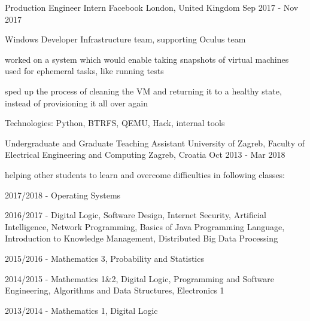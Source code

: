 \begin{cventries}
  \cventry
    {Production Engineer Intern} %
    {Facebook} %
    {London, United Kingdom} %
    {Sep 2017 - Nov 2017} %
    {
      \begin{cvitems} %
        \item {Windows Developer Infrastructure team, supporting Oculus team}
        \item {worked on a system which would enable taking snapshots of virtual machines used for ephemeral tasks, like running tests}
        \item {sped up the process of cleaning the VM and returning it to a healthy state, instead of provisioning it all over again}
        \item {Technologies: Python, BTRFS, QEMU, Hack, internal tools}
      \end{cvitems}
    }

  \cventry
    {Undergraduate and Graduate Teaching Assistant} %
    {University of Zagreb, Faculty of Electrical Engineering and Computing} %
    {Zagreb, Croatia} %
    {Oct 2013 - Mar 2018} %
    {
      \begin{cvitems} %
        \item {helping other students to learn and overcome difficulties in following classes:}
        \item {2017/2018 - Operating Systems}
        \item {2016/2017 - Digital Logic, Software Design, Internet Security, Artificial Intelligence, Network Programming, Basics of Java Programming Language, Introduction to Knowledge Management, Distributed Big Data Processing}
        \item {2015/2016 - Mathematics 3, Probability and Statistics}
        \item {2014/2015 - Mathematics 1\&2, Digital Logic, Programming and Software Engineering, Algorithms and Data Structures, Electronics 1}
        \item {2013/2014 - Mathematics 1, Digital Logic}
      \end{cvitems}
    }


\end{cventries}

